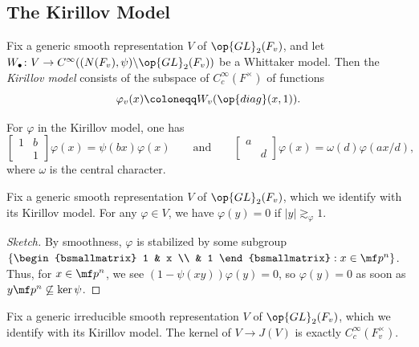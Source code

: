 \documentclass{article}
\begin{document}
\subsection{The Kirillov Model}
\begin{definition}
	Fix a generic smooth representation $V$ of $\op{GL}_2(F_v)$, and let $W_\bullet\colon V\to C^\infty((N(F_v),\psi)\backslash\op{GL}_2(F_v))$ be a Whittaker model. Then the \textit{Kirillov model} consists of the subspace of $C_c^\infty(F^\times)$ of functions
	\[\varphi_v(x)\coloneqq W_v(\op{diag}(x,1)).\]
\end{definition}
\begin{remark}
	For $\varphi$ in the Kirillov model, one has
	\[\begin{bmatrix}
		1 & b \\ & 1
	\end{bmatrix}\varphi(x)=\psi(bx)\varphi(x)\qquad\text{and}\qquad\begin{bmatrix}
		a \\ & d
	\end{bmatrix}\varphi(x)=\omega(d)\varphi(ax/d),\]
	where $\omega$ is the central character.
\end{remark}
\begin{lemma}
	Fix a generic smooth representation $V$ of $\op{GL}_2(F_v)$, which we identify with its Kirillov model. For any $\varphi\in V$, we have $\varphi(y)=0$ if $\left|y\right|\gtrsim_\varphi1$.
\end{lemma}
\begin{proof}[Sketch]
	By smoothness, $\varphi$ is stabilized by some subgroup $\left\{\begin{bsmallmatrix}
		1 & x \\ & 1
	\end{bsmallmatrix}:x\in\mf p^n\right\}$. Thus, for $x\in\mf p^n$, we see $(1-\psi(xy))\varphi(y)=0$, so $\varphi(y)=0$ as soon as $y\mf p^n\not\subseteq\ker\psi$.
\end{proof}
\begin{lemma}
	Fix a generic irreducible smooth representation $V$ of $\op{GL}_2(F_v)$, which we identify with its Kirillov model. The kernel of $V\to J(V)$ is exactly $C_c^\infty(F_v^\times)$.
\end{lemma}
\end{document}
